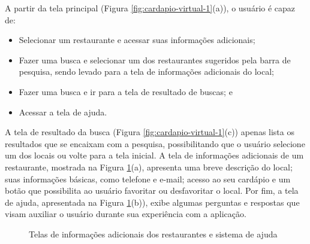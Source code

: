 A partir da tela principal (Figura \ref{fig:cardapio-virtual-1}(a)), o usuário é capaz de:
\begin{itemize}
	\item Selecionar um restaurante e acessar suas informações adicionais;
	\item Fazer uma busca e selecionar um dos restaurantes sugeridos pela barra de pesquisa, sendo levado para a tela de informações adicionais do local;
	\item Fazer uma busca e ir para a tela de resultado de buscas; e
	\item Acessar a tela de ajuda.
\end{itemize}
A tela de resultado da busca (Figura \ref{fig:cardapio-virtual-1}(c)) apenas lista os resultados que se encaixam com a pesquisa, possibilitando que o usuário selecione um dos locais ou volte para a tela inicial. A tela de informações adicionais de um restaurante, mostrada na Figura \ref{fig:cardapio-virtual-2}(a), apresenta uma breve descrição do local; suas informações básicas, como telefone e e-mail; acesso ao seu cardápio e um botão que possibilita ao usuário favoritar ou desfavoritar o local. Por fim, a tela de ajuda, apresentada na Figura \ref{fig:cardapio-virtual-2}(b)), exibe algumas perguntas e respostas que visam auxiliar o usuário durante sua experiência com a aplicação.

\begin{figure}[H]
	\centering
	\caption[Telas da Aplicação 4--5]{Telas de informações adicionais dos restaurantes e sistema de ajuda}
	\label{fig:cardapio-virtual-2}
	\qquad
\end{figure}

